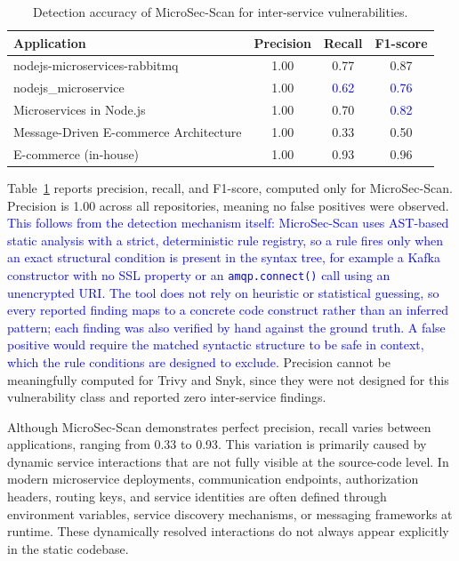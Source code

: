 \documentclass[preprint,12pt]{elsarticle}
\newcommand{\new}[1]{\textcolor{blue}{#1}}
\newcommand{\safefixtablestyle}{%
  \small
  \setlength{\tabcolsep}{5pt}
  \renewcommand{\arraystretch}{1.15}
}
\begin{document}
\begin{table}[!t]
\centering
\caption{Detection accuracy of MicroSec-Scan for inter-service vulnerabilities.}
\label{tab:microsec_accuracy}
\safefixtablestyle
\begin{tabular}{@{} l c c c @{}}
\toprule
\textbf{Application} & \textbf{Precision} & \textbf{Recall} & \textbf{F1-score} \\
\midrule
nodejs-microservices-rabbitmq & 1.00 & 0.77 & 0.87 \\
nodejs\_microservice & 1.00 & \new{0.62} & \new{0.76} \\
Microservices in Node.js & 1.00 & 0.70 & \new{0.82} \\
Message-Driven E-commerce Architecture & 1.00 & 0.33 & 0.50 \\
E-commerce (in-house) & 1.00 & 0.93 & 0.96 \\
\bottomrule
\end{tabular}
\end{table}

Table~\ref{tab:microsec_accuracy} reports precision, recall, and F1-score, computed only for MicroSec-Scan. Precision is 1.00 across all repositories, meaning no false positives were observed. \new{This follows from the detection mechanism itself: MicroSec-Scan uses AST-based static analysis with a strict, deterministic rule registry, so a rule fires only when an exact structural condition is present in the syntax tree, for example a Kafka constructor with no SSL property or an \texttt{amqp.connect()} call using an unencrypted URI. The tool does not rely on heuristic or statistical guessing, so every reported finding maps to a concrete code construct rather than an inferred pattern; each finding was also verified by hand against the ground truth. A false positive would require the matched syntactic structure to be safe in context, which the rule conditions are designed to exclude.} Precision cannot be meaningfully computed for Trivy and Snyk, since they were not designed for this vulnerability class and reported zero inter-service findings.



Although MicroSec-Scan demonstrates perfect precision, recall varies between applications, ranging from 0.33 to 0.93. This variation is primarily caused by dynamic service interactions that are not fully visible at the source-code level. In modern microservice deployments, communication endpoints, authorization headers, routing keys, and service identities are often defined through environment variables, service discovery mechanisms, or messaging frameworks at runtime. These dynamically resolved interactions do not always appear explicitly in the static codebase.
\end{document}
